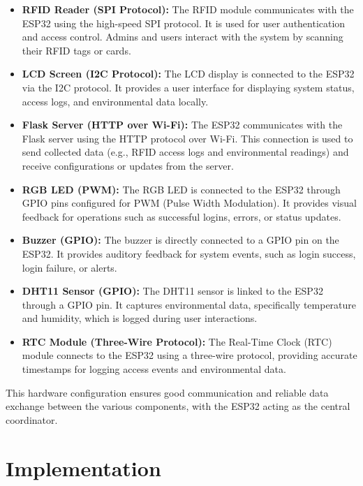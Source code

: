 \documentclass[a4paper,12pt]{report}
\begin{document}
\begin{itemize}
    \item \textbf{RFID Reader (SPI Protocol):} The RFID module communicates with the ESP32 using the high-speed SPI protocol. It is used for user authentication and access control. Admins and users interact with the system by scanning their RFID tags or cards.

    \item \textbf{LCD Screen (I2C Protocol):} The LCD display is connected to the ESP32 via the I2C protocol. It provides a user interface for displaying system status, access logs, and environmental data locally.

    \item \textbf{Flask Server (HTTP over Wi-Fi):} The ESP32 communicates with the Flask server using the HTTP protocol over Wi-Fi. This connection is used to send collected data (e.g., RFID access logs and environmental readings) and receive configurations or updates from the server.

    \item \textbf{RGB LED (PWM):} The RGB LED is connected to the ESP32 through GPIO pins configured for PWM (Pulse Width Modulation). It provides visual feedback for operations such as successful logins, errors, or status updates.

    \item \textbf{Buzzer (GPIO):} The buzzer is directly connected to a GPIO pin on the ESP32. It provides auditory feedback for system events, such as login success, login failure, or alerts.

    \item \textbf{DHT11 Sensor (GPIO):} The DHT11 sensor is linked to the ESP32 through a GPIO pin. It captures environmental data, specifically temperature and humidity, which is logged during user interactions.

    \item \textbf{RTC Module (Three-Wire Protocol):} The Real-Time Clock (RTC) module connects to the ESP32 using a three-wire protocol, providing accurate timestamps for logging access events and environmental data.

\end{itemize}

This hardware configuration ensures good communication and reliable data exchange between the various components, with the ESP32 acting as the central coordinator.

\chapter{Implementation}
\end{document}
